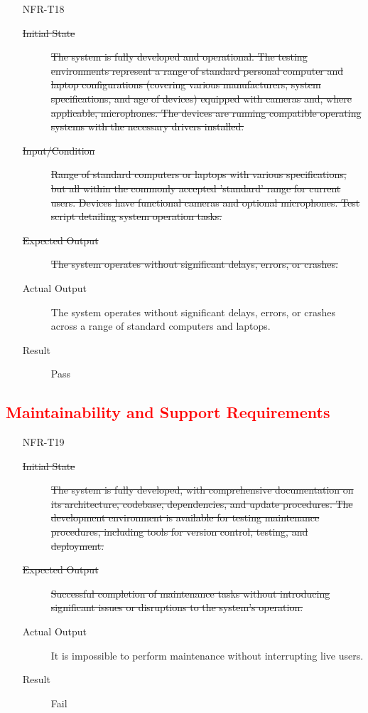 \documentclass[12pt, titlepage]{article}
\newcommand{\rt}[1]{\textcolor{red}{#1}}
\begin{document}
\begin{enumerate}
    \item[NFR-T18] \label{NFRT18}
      \begin{description}
      \item[\sout{Initial State}]\sout{ The system is fully developed and operational. The testing
        environments represent a range of standard personal computer and laptop
        configurations (covering various manufacturers, system specifications, and
        age of devices) equipped with cameras and, where applicable, microphones.
        The devices are running compatible operating systems with the necessary
        drivers installed.
      }
      \item[\sout{Input/Condition}]\sout{ Range of standard computers or laptops with various
        specifications, but all within the commonly accepted 'standard' range for
        current users. Devices have functional cameras and optional microphones.
        Test script detailing system operation tasks.
      }
      \item[\sout{Expected Output}]\sout{ The system operates without significant delays, errors,
        or crashes.
      }
      \item[Actual Output] The system operates without significant delays, errors, or
        crashes across a range of standard computers and laptops.
      \item[Result] Pass
      \end{description}
  \end{enumerate}
  
  \rt{ \subsection{Maintainability and Support Requirements} }
  \begin{enumerate}
    \item[NFR-T19] \label{NFRT19}
      \begin{description}
      \item[\sout{Initial State}]\sout{ The system is fully developed, with comprehensive
        documentation on its architecture, codebase, dependencies, and update
        procedures. The development environment is available for testing
        maintenance procedures, including tools for version control, testing, and
        deployment.
      }
      \item[\sout{Expected Output}]\sout{ Successful completion of maintenance tasks without
        introducing significant issues or disruptions to the system's operation.
      }
      \item[Actual Output] It is impossible to perform maintenance without
        interrupting live users.
      \item[Result] Fail
      \end{description}
    \addtocounter{enumi}{2}
  \end{enumerate}
  
\end{document}
